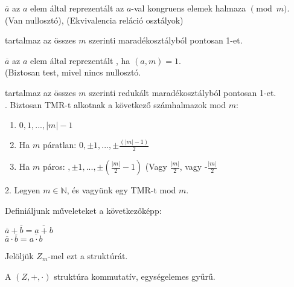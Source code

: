 \begin{frame}
  \begin{tcolorbox}[title={Def.: TMR, RMR}]
    $\overline{a}$ az $a$ elem által reprezentált  az $a$-val kongruens elemek halmaza $\pmod{m}$.\\
    {\footnotesize (Van nullosztó), (Ekvivalencia reláció osztályok)}
    \mmedskip

     tartalmaz az összes $m$ szerinti maradékosztályból pontosan 1-et.\\
    \mmedskip

    $\overline{a}$ az $a$ elem által reprezentált , ha $(a, m) = 1$.\\
    {\footnotesize (Biztosan test, mivel nincs nullosztó.}\\
    \mmedskip

     tartalmaz az összes $m$ szerinti redukált maradékosztályból pontosan 1-et.\\
  . Biztosan TMR-t alkotnak a következő számhalmazok mod $m$:\\
    \begin{enumerate}
      \item $0, 1, ..., |m| - 1$
      \item Ha $m$ páratlan: $0, {\pm}1, ..., {\pm}\frac{(|m| - 1)}{2}$
      \item Ha $m$ páros: $ , {\pm}1, ..., {\pm}(\frac{|m|}{2} - 1)$ (Vagy $\frac{|m|}{2}$, vagy -$\frac{|m|}{2}$
    \end{enumerate}
    \mmedskip

    2. Legyen $m \in \mathbb{N}$, és vagyünk egy TMR-t mod $m$.\\
    \msmallskip
    
    Definiáljunk műveleteket a következőképp:\\
    \mtinyskip
    
    $\overline{a} + \overline{b} = \overline{a + b}$\\
    $\overline{a} \cdot \overline{b} = \overline{a \cdot b}$\\
    \mtinyskip
    
    Jelöljük $Z_m$-mel ezt a struktúrát.\\
    \mtinyskip

    A $(Z, +, {\cdot})$ struktúra kommutatív, egységelemes gyűrű.
  \end{tcolorbox}
\end{frame}

